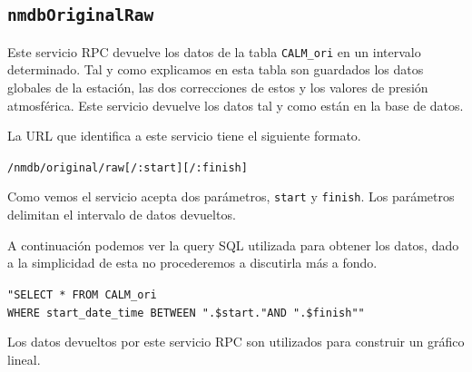 	\subsection{\texttt{nmdbOriginalRaw}}
		Este servicio RPC devuelve los datos de la tabla \texttt{CALM\_ori} en un intervalo determinado. Tal y como explicamos en esta tabla
		son guardados los datos globales de la estación, las dos correcciones de estos y los valores de presión atmosférica. Este servicio
		devuelve los datos tal y como están en la base de datos. 
	  	\par
		La URL que identifica a este servicio tiene el siguiente formato.
	  		\begin{center} \texttt{/nmdb/original/raw[/:start][/:finish]}  \end{center} 
		Como vemos el servicio acepta dos parámetros, \texttt{start} y \texttt{finish}. Los parámetros delimitan el intervalo de datos
		devueltos.
		\par
		A continuación podemos ver la query SQL utilizada para obtener los datos, dado a la simplicidad de esta no procederemos a discutirla
		más a fondo.
	  		\begin{center} \texttt{"SELECT * FROM CALM\_ori 
			  		\\	WHERE start\_date\_time BETWEEN \cc".\$start."\cc AND \cc".\$finish"\cc"}
			\end{center} 
		Los datos devueltos por este servicio RPC son utilizados para construir un gráfico lineal.
